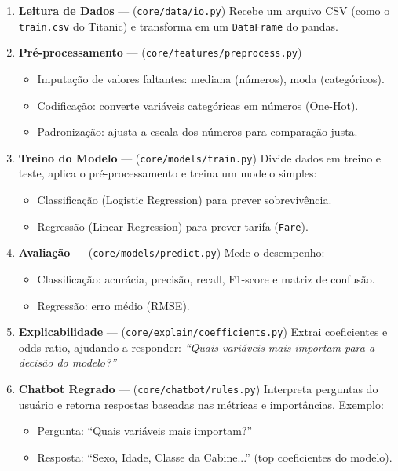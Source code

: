 \documentclass[12pt,a4paper]{article}
\begin{document}
\begin{enumerate}
  \item \textbf{Leitura de Dados} --- (\texttt{core/data/io.py})  
  Recebe um arquivo CSV (como o \texttt{train.csv} do Titanic) e transforma em um \texttt{DataFrame} do pandas.
  
  \item \textbf{Pré-processamento} --- (\texttt{core/features/preprocess.py})  
  \begin{itemize}
    \item Imputação de valores faltantes: mediana (números), moda (categóricos).  
    \item Codificação: converte variáveis categóricas em números (One-Hot).  
    \item Padronização: ajusta a escala dos números para comparação justa.
  \end{itemize}

  \item \textbf{Treino do Modelo} --- (\texttt{core/models/train.py})  
  Divide dados em treino e teste, aplica o pré-processamento e treina um modelo simples:  
  \begin{itemize}
    \item Classificação (Logistic Regression) para prever sobrevivência.  
    \item Regressão (Linear Regression) para prever tarifa (\texttt{Fare}).  
  \end{itemize}

  \item \textbf{Avaliação} --- (\texttt{core/models/predict.py})  
  Mede o desempenho:  
  \begin{itemize}
    \item Classificação: acurácia, precisão, recall, F1-score e matriz de confusão.  
    \item Regressão: erro médio (RMSE).  
  \end{itemize}

  \item \textbf{Explicabilidade} --- (\texttt{core/explain/coefficients.py})  
  Extrai coeficientes e odds ratio, ajudando a responder:  
  \textit{“Quais variáveis mais importam para a decisão do modelo?”}

  \item \textbf{Chatbot Regrado} --- (\texttt{core/chatbot/rules.py})  
  Interpreta perguntas do usuário e retorna respostas baseadas nas métricas e importâncias.  
  Exemplo:  
  \begin{itemize}
    \item Pergunta: “Quais variáveis mais importam?”  
    \item Resposta: “Sexo, Idade, Classe da Cabine...” (top coeficientes do modelo).  
  \end{itemize}
\end{enumerate}
\end{document}
